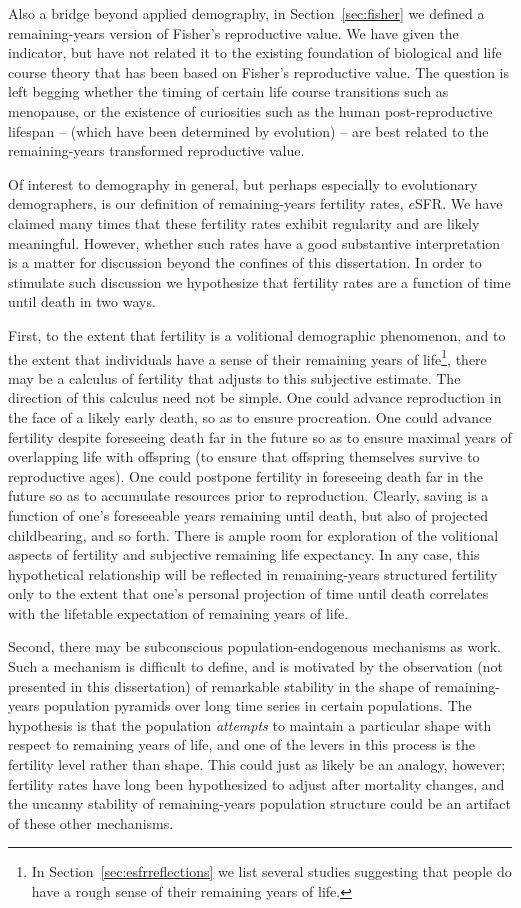 Also a bridge beyond applied demography, in Section~\ref{sec:fisher} we
defined a remaining-years version of Fisher's reproductive value. We
have given the indicator, but have not related it to the existing foundation of
biological and life course theory that has been based on Fisher's reproductive
value. The question is left begging whether the timing of certain
life course transitions such as menopause, or the existence of curiosities such 
as the human post-reproductive lifespan -- (which have been determined by
evolution) -- are best related to the remaining-years transformed reproductive
value.

Of interest to demography in general, but perhaps especially to evolutionary
demographers, is our definition of remaining-years fertility rates, $e$SFR. We
have claimed many times that these fertility rates exhibit
regularity and are likely meaningful. However, whether such rates have a good
substantive interpretation is a matter for discussion beyond the confines of
this dissertation. In order to stimulate such discussion we hypothesize that fertility rates are a
function of time until death in two ways. 

First, to the extent that fertility is
a volitional demographic phenomenon, and to the extent that individuals have a
sense of their remaining years of life\footnote{In
Section~\ref{sec:esfrreflections} we list several studies suggesting that people
do have a rough sense of their remaining years of life.}, there may be a calculus of fertility that adjusts to
this subjective estimate. The direction of this calculus need not be simple. One
could advance reproduction in the face of a likely early death, so as to ensure
procreation. One could advance fertility despite foreseeing death far in the
future so as to ensure maximal years of overlapping life with offspring (to
ensure that offspring themselves survive to reproductive ages). One could
postpone fertility in foreseeing death far in the future so as to accumulate resources prior to
reproduction. Clearly, saving is a function of one's foreseeable years
remaining until death, but also of projected childbearing, and so forth. There
is ample room for exploration of the volitional aspects of fertility and
subjective remaining life expectancy. In any case, this hypothetical
relationship will be reflected in remaining-years structured fertility only to
the extent that one's personal projection of time until death correlates with
the lifetable expectation of remaining years of life.

Second, there may be subconscious population-endogenous mechanisms as work.
Such a mechanism is difficult to define, and is motivated by the
observation (not presented in this dissertation) of remarkable stability in the shape of remaining-years population pyramids over long time series in certain
populations. The hypothesis is that the population \textit{attempts} to 
maintain a particular shape with respect to remaining years of life, and one of
the levers in this process is the fertility level rather than shape. This could 
just as likely be an analogy, however; fertility rates have
long been hypothesized to adjust after mortality changes, and the uncanny
stability of remaining-years population structure could be an artifact of these
other mechanisms. 

